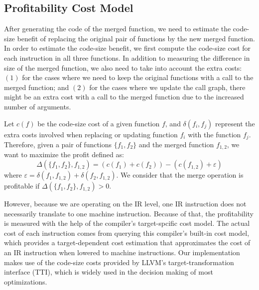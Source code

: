 \subsection{Profitability Cost Model}

After generating the code of the merged function, we need to estimate the
code-size benefit of replacing the original pair of functions by the new merged
function.
In order to estimate the code-size benefit, we first compute the code-size cost
for each instruction in all three functions.
In addition to measuring the difference in size of the merged function, we also
need to take into account the extra costs:
$(1)$ for the cases where we need to keep the original functions with a call to
the merged function;
and $(2)$ for the cases where we update the call graph, there might be an extra
cost with a call to the merged function due to the increased number of arguments.

Let $c(f)$ be the code-size cost of a given function $f$, and
$\delta(f_i, f_j)$ represent the extra costs involved when replacing or
updating function $f_i$ with the function $f_j$.
Therefore, given a pair of functions $\{f_1,f_2\}$ and the merged function
$f_{1,2}$, we want to maximize the profit defined as:
\[
  \Delta(\{f_1,f_2\},f_{1,2}) = (c(f_1)+c(f_2)) - (c(f_{1,2}) + \varepsilon)
\]
where $\varepsilon = \delta(f_1, f_{1,2}) + \delta(f_2, f_{1,2})$.
We consider that the merge operation is profitable if $\Delta(\{f_1,f_2\},f_{1,2})>0$.

However, because we are operating on the IR level, one IR instruction does not
necessarily translate to one machine instruction.
Because of that, the profitability is measured with the help of the compiler's
target-spcific cost model.
The actual cost of each instruction comes from querying this compiler's built-in
cost model, which provides a target-dependent cost estimation that approximates
the cost of an IR instruction when lowered to machine instructions.
Our implementation makes use of the code-size costs provided by LLVM's
target-transformation interface (TTI), which is widely used in the decision
making of most optimizations.
